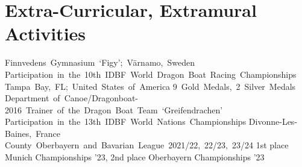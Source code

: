 \documentclass[11pt,a4paper]{moderncv}
\begin{document}
\section{Extra-Curricular, Extramural Activities}
%
{Finnvedens~Gymnasium~`Figy';~Värnamo,~Sweden}{}{}{}
%
{Participation~in~the~10th~IDBF~World~Dragon~Boat~Racing~Championships\newline}{}%
{Tampa~Bay,~FL;~United~States~of~America\newline}%
{9~Gold~Medals,~2~Silver~Medals}
%
{Department~of~Canoe/Dragonboat-2016~Trainer~of~the~Dragon~Boat~Team~`Greifendrachen'}{}{}{}{}
%
{Participation~in~the~13th~IDBF~World~Nations~Championships\newline}{}%
{Divonne-Les-Baines,~France}{}
%
{County~Oberbayern~and~Bavarian~League~2021/22,~22/23,~23/24\newline}{}%
{1st place Munich Championships '23, 2nd place Oberbayern Championships '23}{}%
\end{document}
